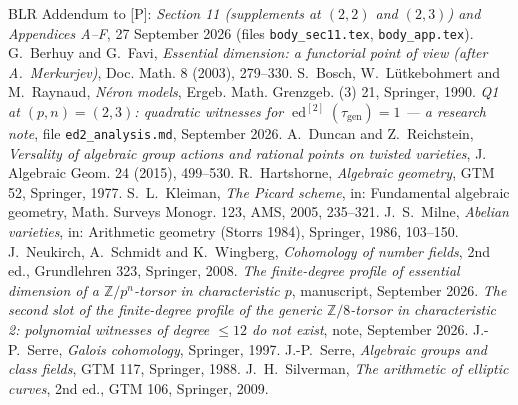 \documentclass[11pt]{amsart}
\theoremstyle{definition}
\theoremstyle{remark}
\newcommand{\ed}{\operatorname{ed}}
\newcommand{\gen}{\mathrm{gen}}
\newcommand{\Z}{\mathbb Z}
\begin{document}
\begin{thebibliography}{BLR}
 Addendum to [P]: \emph{Section 11 (supplements at $(2,2)$ and $(2,3)$) and
Appendices A--F}, 27 September 2026 (files \texttt{body\_sec11.tex}, \texttt{body\_app.tex}).
 G.~Berhuy and G.~Favi, \emph{Essential dimension: a functorial point of
view (after A.~Merkurjev)}, Doc. Math. 8 (2003), 279--330.
 S.~Bosch, W.~L\"utkebohmert and M.~Raynaud, \emph{N\'eron models},
Ergeb. Math. Grenzgeb. (3) 21, Springer, 1990.
 \emph{Q1 at $(p,n)=(2,3)$: quadratic witnesses for $\ed^{[2]}(\tau_{\gen})=1$ --- a research note}, file \texttt{ed2\_analysis.md}, September 2026.
 A.~Duncan and Z.~Reichstein, \emph{Versality of algebraic group actions
and rational points on twisted varieties}, J. Algebraic Geom. 24 (2015), 499--530.
 R.~Hartshorne, \emph{Algebraic geometry}, GTM 52, Springer, 1977.
 S.~L.~Kleiman, \emph{The Picard scheme}, in: Fundamental algebraic
geometry, Math. Surveys Monogr. 123, AMS, 2005, 235--321.
 J.~S.~Milne, \emph{Abelian varieties}, in: Arithmetic geometry (Storrs
1984), Springer, 1986, 103--150.
 J.~Neukirch, A.~Schmidt and K.~Wingberg, \emph{Cohomology of number
fields}, 2nd ed., Grundlehren 323, Springer, 2008.
 \emph{The finite-degree profile of essential dimension of a
$\Z/p^n$-torsor in characteristic $p$}, manuscript, September 2026.
 \emph{The second slot of the finite-degree profile of the generic
$\Z/8$-torsor in characteristic 2: polynomial witnesses of degree $\le12$ do not exist},
note, September 2026.
 J.-P.~Serre, \emph{Galois cohomology}, Springer, 1997.
 J.-P.~Serre, \emph{Algebraic groups and class fields}, GTM 117,
Springer, 1988.
 J.~H.~Silverman, \emph{The arithmetic of elliptic curves}, 2nd ed.,
GTM 106, Springer, 2009.
\end{thebibliography}
\end{document}
